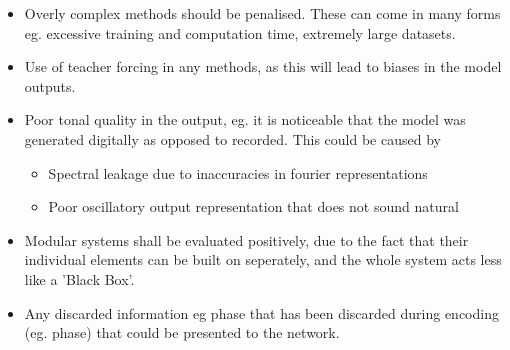 \begin{itemize}
    \item Overly complex methods should be penalised. These can come in many forms
    eg. excessive training and computation time, extremely large datasets.
    \item Use of teacher forcing in any methods, as this will lead to biases in
    the model outputs.
    \item Poor tonal quality in the output, eg. it is noticeable that the model
    was generated digitally as opposed to recorded. This could be caused by
    \begin{itemize}
        \item Spectral leakage due to inaccuracies in fourier representations
        \item Poor oscillatory output representation that does not sound natural
    \end{itemize}
    \item Modular systems shall be evaluated positively, due to the fact that their
    individual elements can be built on seperately, and the whole system acts less
    like a 'Black Box'.
    \item Any discarded information eg phase that has been discarded during encoding
    (eg. phase) that could be presented to the network.
\end{itemize}